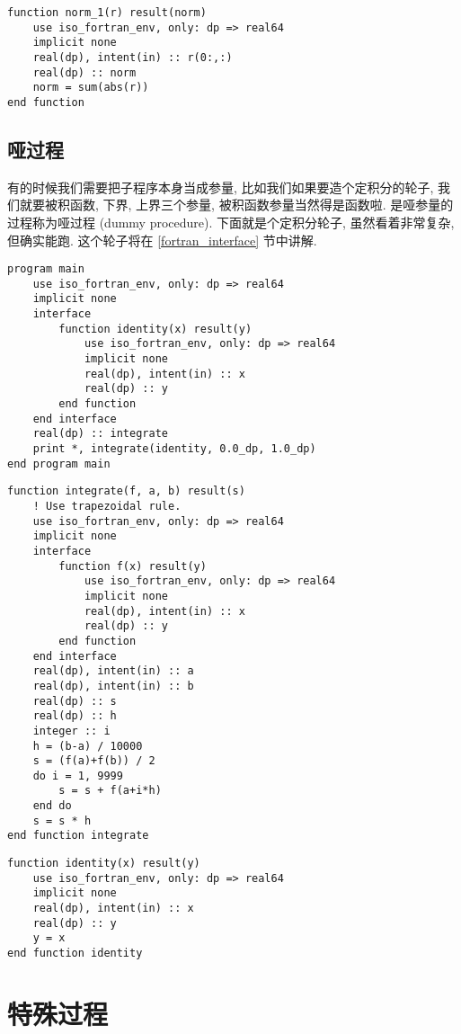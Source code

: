 \begin{lstlisting}
function norm_1(r) result(norm)
    use iso_fortran_env, only: dp => real64
    implicit none
    real(dp), intent(in) :: r(0:,:)
    real(dp) :: norm
    norm = sum(abs(r))
end function
\end{lstlisting} 

\subsection{哑过程} 

有的时候我们需要把子程序本身当成参量, 比如我们如果要造个定积分的轮子, 我们就要被积函数, 下界, 上界三个参量, 被积函数参量当然得是函数啦. 是哑参量的过程称为哑过程 (dummy procedure). 下面就是个定积分轮子, 虽然看着非常复杂, 但确实能跑. 这个轮子将在 \ref{fortran_interface} 节中讲解. \label{dummy_procedure_program} 
\begin{lstlisting} 
program main
    use iso_fortran_env, only: dp => real64
    implicit none
    interface
        function identity(x) result(y)
            use iso_fortran_env, only: dp => real64
            implicit none
            real(dp), intent(in) :: x
            real(dp) :: y
        end function
    end interface
    real(dp) :: integrate
    print *, integrate(identity, 0.0_dp, 1.0_dp)
end program main
\end{lstlisting}
\begin{lstlisting}
function integrate(f, a, b) result(s)
    ! Use trapezoidal rule.
    use iso_fortran_env, only: dp => real64
    implicit none
    interface
        function f(x) result(y)
            use iso_fortran_env, only: dp => real64
            implicit none
            real(dp), intent(in) :: x
            real(dp) :: y
        end function
    end interface
    real(dp), intent(in) :: a
    real(dp), intent(in) :: b
    real(dp) :: s
    real(dp) :: h
    integer :: i
    h = (b-a) / 10000
    s = (f(a)+f(b)) / 2
    do i = 1, 9999
        s = s + f(a+i*h)
    end do
    s = s * h
end function integrate
\end{lstlisting}
\begin{lstlisting}
function identity(x) result(y)
    use iso_fortran_env, only: dp => real64
    implicit none
    real(dp), intent(in) :: x
    real(dp) :: y
    y = x
end function identity
\end{lstlisting} 

\section{特殊过程}

